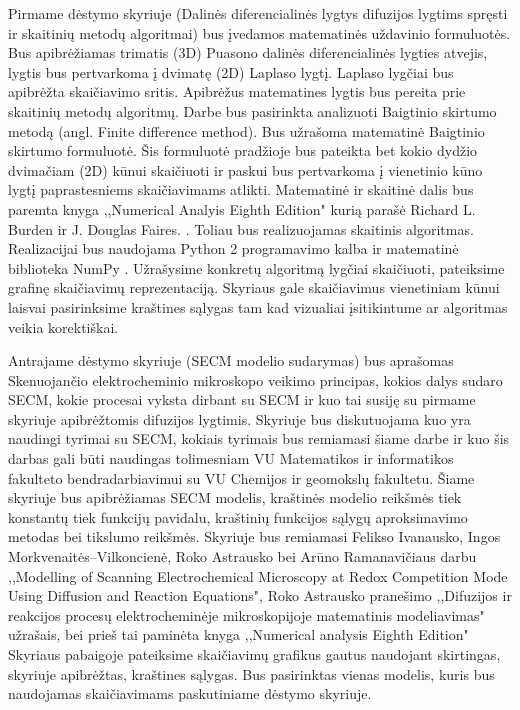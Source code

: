 \documentclass{VUMIFPSkursinis}
\begin{document}
Pirmame dėstymo skyriuje (Dalinės diferencialinės lygtys difuzijos lygtims spręsti ir skaitinių metodų algoritmai) bus įvedamos matematinės uždavinio formuluotės.
Bus apibrėžiamas trimatis (3D) Puasono dalinės diferencialinės lygties atvejis, lygtis bus pertvarkoma į dvimatę (2D) Laplaso lygtį.
Laplaso lygčiai bus apibrėžta skaičiavimo sritis.
Apibrėžus matematines lygtis bus pereita prie skaitinių metodų algoritmų.
Darbe bus pasirinkta analizuoti Baigtinio skirtumo metodą (angl. Finite difference method).
Bus užrašoma matematinė Baigtinio skirtumo formuluotė.
Šis formuluotė pradžioje bus pateikta bet kokio dydžio dvimačiam (2D) kūnui skaičiuoti ir paskui bus pertvarkoma į vienetinio kūno lygtį paprastesniems skaičiavimams atlikti.
Matematinė ir skaitinė dalis bus paremta knyga ,,Numerical Analyis Eighth Edition" kurią parašė Richard L. Burden ir J. Douglas Faires. \cite{NumAnal}.
Toliau bus realizuojamas skaitinis algoritmas.
Realizacijai bus naudojama Python 2 programavimo kalba \cite{Py} ir matematinė biblioteka NumPy \cite{Np}.
Užrašysime konkretų algoritmą lygčiai skaičiuoti, pateiksime grafinę skaičiavimų reprezentaciją.
Skyriaus gale skaičiavimus vienetiniam kūnui laisvai pasirinksime kraštines sąlygas tam kad vizualiai įsitikintume ar algoritmas veikia korektiškai.


Antrajame dėstymo skyriuje (SECM modelio sudarymas) bus aprašomas Skenuojančio elektrocheminio mikroskopo veikimo principas, kokios dalys sudaro SECM, kokie procesai vyksta dirbant su SECM ir kuo tai susiję su pirmame skyriuje apibrėžtomis difuzijos lygtimis.
Skyriuje bus diskutuojama kuo yra naudingi tyrimai su SECM, kokiais tyrimais bus remiamasi šiame darbe ir kuo šis darbas gali būti naudingas tolimesniam VU Matematikos ir informatikos fakulteto bendradarbiavimui su VU Chemijos ir geomokslų fakultetu.
Šiame skyriuje bus apibrėžiamas SECM modelis, kraštinės modelio reikšmės tiek konstantų tiek funkcijų pavidalu, kraštinių funkcijos sąlygų aproksimavimo metodas bei tikslumo reikšmės.
Skyriuje bus remiamasi Felikso Ivanausko, Ingos Morkvenaitės–Vilkoncienė, Roko Astrausko bei Arūno Ramanavičiaus darbu ,,Modelling of Scanning Electrochemical Microscopy at Redox
Competition Mode Using Diffusion and Reaction Equations", Roko Astrausko pranešimo ,,Difuzijos ir reakcijos procesų elektrocheminėje mikroskopijoje matematinis modeliavimas" užrašais, bei prieš tai paminėta knyga ,,Numerical analysis Eighth Edition" \cite{NumAnal}
Skyriaus pabaigoje pateiksime skaičiavimų grafikus gautus naudojant skirtingas, skyriuje apibrėžtas, kraštines sąlygas.
Bus pasirinktas vienas modelis, kuris bus naudojamas skaičiavimams paskutiniame dėstymo skyriuje.
\end{document}
